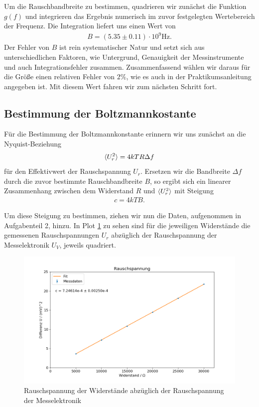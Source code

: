 Um die Rauschbandbreite zu bestimmen, quadrieren wir zunächst die Funktion $g(f)$ und integrieren das Ergebnis numerisch im zuvor festgelegten Wertebereich der Frequenz. Die Integration liefert uns einen Wert von
\begin{align}
  B = (5.35 \pm 0.11) \cdot 10^9 \si{\hertz}.
\end{align}
Der Fehler von $B$ ist rein systematischer Natur und setzt sich aus unterschiedlichen Faktoren, wie Untergrund, Genauigkeit der Messinstrumente und auch Integrationsfehler zusammen. Zusammenfassend wählen wir daraus für die Größe einen relativen Fehler von $2\%$, wie es auch in der Praktikumsanleitung angegeben ist. Mit diesem Wert fahren wir zum nächsten Schritt fort.

\subsection{Bestimmung der Boltzmannkostante}

Für die Bestimmung der Boltzmannkonstante erinnern wir uns zunächst an die Nyquist-Beziehung
\begin{align}
  \langle U_r^2 \rangle = 4kTR\Delta f
\end{align}
für den Effektivwert der Rauschspannung $U_r$. Ersetzen wir die Bandbreite $\Delta f$ durch die zuvor bestimmte Rauschbandbreite $B$, so ergibt sich ein linearer Zusammenhang zwischen dem Widerstand $R$ und $\langle U_r^2 \rangle$ mit Steigung 
\begin{align}
  c = 4 k T B. \label{eq:slope_rms}
\end{align}

Um diese Steigung zu bestimmen, ziehen wir nun die Daten, aufgenommen in Aufgabenteil 2, hinzu. In Plot \ref{plot:Ur_daten} zu sehen sind für die jeweiligen Widerstände die gemessenen Rauschspannungen $U_r$ abzüglich der Rauschspannung der Messelektronik $U_V$, jeweils quadriert.

\begin{figure}[H]
  \centering
  \includegraphics[width=.8\textwidth]{files/ur_data_fit.png}
  \caption{Rauschspannung der Widerstände abzüglich der Rauschspannung der Messelektronik}
  \label{plot:Ur_daten}
\end{figure}

